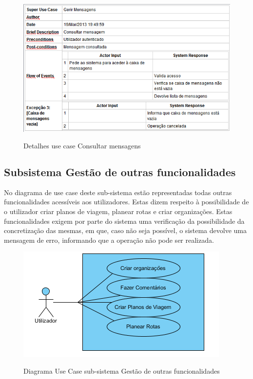 \documentclass[12pt,a4paper]{article}
\begin{document}
\begin{figure}[h!]
\centering
\includegraphics[scale=0.7]{d_usecase/consultarmensagem}
\label{usecase}
\caption{Detalhes use case Consultar mensagens}
\end{figure}

\clearpage
\newpage

\subsection{Subsistema Gestão de outras funcionalidades}
No diagrama de use case deste sub-sistema estão representadas todas outras funcionalidades acessíveis aos utilizadores. Estas dizem respeito à possibilidade de o utilizador criar planos de viagem, planear rotas e criar organizações. Estas funcionalidades exigem por parte do sistema uma verificação da possibilidade da concretização das mesmas, em que, caso não seja possível, o sistema devolve uma mensagem de erro, informando que a operação não pode ser realizada.\\

\begin{figure}[h!]
\centering
\includegraphics[scale=1]{usecase/U_FazerCenas}
\label{usecase}
\caption{Diagrama Use Case sub-sistema Gestão de outras funcionalidades}
\end{figure}
\end{document}
